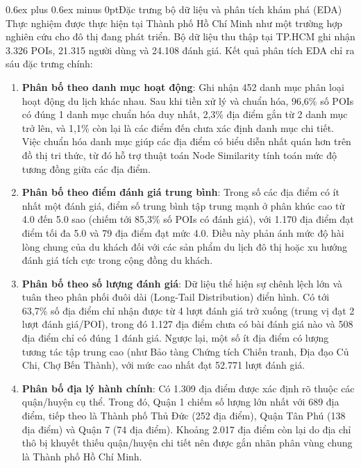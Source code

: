 \documentclass[journal,onecolumn,10pt]{IEEEtran}
\makeatletter
\def\subsection{\@startsection{subsection}{2}{\z@}{1.8ex plus 1.0ex minus 0.3ex}%
{0.6ex plus 0.6ex minus 0pt}{\normalfont\normalsize\bfseries}}
\makeatother
\begin{document}
\subsection{Đặc trưng bộ dữ liệu và phân tích khám phá (EDA)}
Thực nghiệm được thực hiện tại Thành phố Hồ Chí Minh như một trường hợp nghiên cứu cho đô thị đang phát triển. Bộ dữ liệu thu thập tại TP.HCM ghi nhận 3.326 POIs, 21.315 người dùng và 24.108 đánh giá. Kết quả phân tích EDA chỉ ra sáu đặc trưng chính:
\begin{enumerate}
    \item \textbf{Phân bố theo danh mục hoạt động}: Ghi nhận 452 danh mục phân loại hoạt động du lịch khác nhau. Sau khi tiền xử lý và chuẩn hóa, 96,6\% số POIs có đúng 1 danh mục chuẩn hóa duy nhất, 2,3\% địa điểm gắn từ 2 danh mục trở lên, và 1,1\% còn lại là các điểm đến chưa xác định danh mục chi tiết. Việc chuẩn hóa danh mục giúp các địa điểm có biểu diễn nhất quán hơn trên đồ thị tri thức, từ đó hỗ trợ thuật toán Node Similarity tính toán mức độ tương đồng giữa các địa điểm.
    
    \item \textbf{Phân bố theo điểm đánh giá trung bình}: Trong số các địa điểm có ít nhất một đánh giá, điểm số trung bình tập trung mạnh ở phân khúc cao từ 4.0 đến 5.0 sao (chiếm tới 85,3\% số POIs có đánh giá), với 1.170 địa điểm đạt điểm tối đa 5.0 và 79 địa điểm đạt mức 4.0. Điều này phản ánh mức độ hài lòng chung của du khách đối với các sản phẩm du lịch đô thị hoặc xu hướng đánh giá tích cực trong cộng đồng du khách.
    
    \item \textbf{Phân bố theo số lượng đánh giá}: Dữ liệu thể hiện sự chênh lệch lớn và tuân theo phân phối đuôi dài (Long-Tail Distribution) điển hình. Có tới 63,7\% số địa điểm chỉ nhận được từ 4 lượt đánh giá trở xuống (trung vị đạt 2 lượt đánh giá/POI), trong đó 1.127 địa điểm chưa có bài đánh giá nào và 508 địa điểm chỉ có đúng 1 đánh giá. Ngược lại, một số ít địa điểm có lượng tương tác tập trung cao (như Bảo tàng Chứng tích Chiến tranh, Địa đạo Củ Chi, Chợ Bến Thành), với mức cao nhất đạt 52.771 lượt đánh giá.
    
    \item \textbf{Phân bố địa lý hành chính}: Có 1.309 địa điểm được xác định rõ thuộc các quận/huyện cụ thể. Trong đó, Quận 1 chiếm số lượng lớn nhất với 689 địa điểm, tiếp theo là Thành phố Thủ Đức (252 địa điểm), Quận Tân Phú (138 địa điểm) và Quận 7 (74 địa điểm). Khoảng 2.017 địa điểm còn lại do địa chỉ thô bị khuyết thiếu quận/huyện chi tiết nên được gắn nhãn phân vùng chung là Thành phố Hồ Chí Minh.
    

\end{enumerate}
\end{document}
